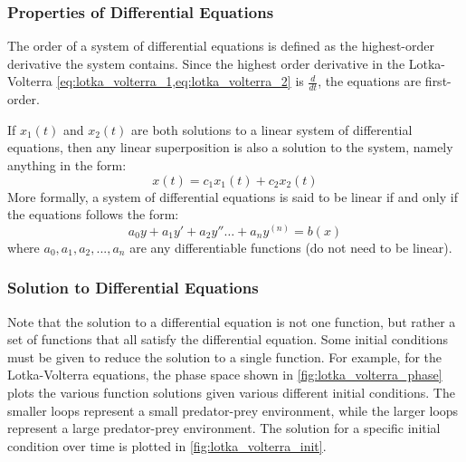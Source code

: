 \subsubsection{Properties of Differential Equations}
\label{subsubsection:properties_differential}
\begin{definition}
    The order of a system of differential equations is defined as the highest-order derivative the system contains. Since the highest order derivative in the Lotka-Volterra \cref{eq:lotka_volterra_1,eq:lotka_volterra_2} is $\frac{d}{dt}$, the equations are first-order.
\end{definition}

\begin{definition}
    If \(x_1(t)\) and \(x_2(t)\) are both solutions to a linear system of differential equations, then any linear superposition is also a solution to the system, namely anything in the form:
    \begin{equation}
        x(t) = c_1 x_1(t) + c_2 x_2(t) 
    \end{equation}
    More formally, a system of differential equations is said to be linear if and only if the equations follows the form:
    \begin{equation}
        a_0 y + a_1 y' + a_2 y'' \dots + a_n y^{(n)} = b(x)
    \end{equation}
    \noindent
    where $a_0, a_1, a_2, ..., a_n$ are any differentiable functions (do not need to be linear).
\end{definition}

\subsubsection{Solution to Differential Equations}
Note that the solution to a differential equation is not one function, but rather a set of functions that all satisfy the differential equation. Some initial conditions must be given to reduce the solution to a single function. For example, for the Lotka-Volterra equations, the phase space shown in \cref{fig:lotka_volterra_phase} plots the various function solutions given various different initial conditions. The smaller loops represent a small predator-prey environment, while the larger loops represent a large predator-prey environment. The solution for a specific initial condition over time is plotted in \cref{fig:lotka_volterra_init}.


